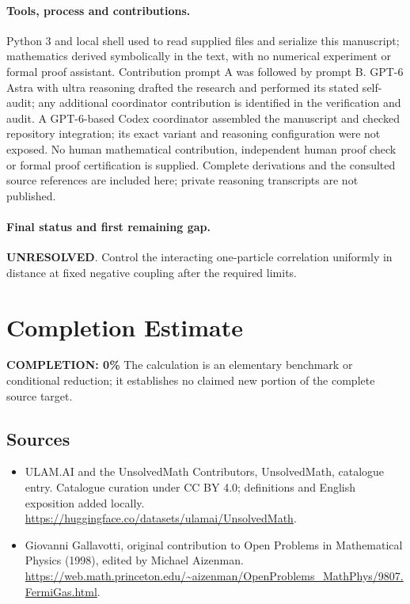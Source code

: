 \documentclass[11pt]{article}
\begin{document}
\paragraph{Tools, process and contributions.}
Python 3 and local shell used to read supplied files and serialize this manuscript; mathematics derived symbolically in the text, with no numerical experiment or formal proof assistant. Contribution prompt A was followed by prompt B. GPT-6 Astra with ultra reasoning drafted the research and performed its stated self-audit; any additional coordinator contribution is identified in the verification and audit. A GPT-6-based Codex coordinator assembled the manuscript and checked repository integration; its exact variant and reasoning configuration were not exposed. No human mathematical contribution, independent human proof check or formal proof certification is supplied. Complete derivations and the consulted source references are included here; private reasoning transcripts are not published.

\paragraph{Final status and first remaining gap.}
\textbf{UNRESOLVED}. Control the interacting one-particle correlation uniformly in distance at fixed negative coupling after the required limits.

\section{Completion Estimate}
\noindent\textbf{COMPLETION: 0\%}
The calculation is an elementary benchmark or conditional reduction; it establishes no claimed new portion of the complete source target.

\subsection{Sources}
\begin{itemize}
\item[\hypertarget{source:statement:1}{S1}] ULAM.AI and the UnsolvedMath Contributors, UnsolvedMath, catalogue entry. Catalogue curation under CC BY 4.0; definitions and English exposition added locally.
\url{https://huggingface.co/datasets/ulamai/UnsolvedMath}.
\item[\hypertarget{source:statement:2}{S2}] Giovanni Gallavotti, original contribution to Open Problems in Mathematical Physics (1998), edited by Michael Aizenman.
\url{https://web.math.princeton.edu/~aizenman/OpenProblems_MathPhys/9807.FermiGas.html}.
\end{itemize}
\label{end:statement}
\end{document}
